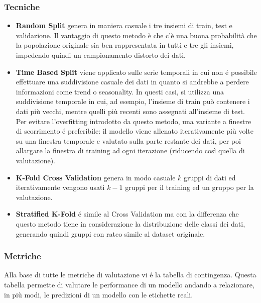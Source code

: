 \subsubsection{Tecniche}
\begin{itemize}
	\item \textbf{Random Split} genera in maniera casuale i tre insiemi di train, test e validazione. Il vantaggio di questo metodo è che c'è una buona probabilità che la popolazione originale sia ben rappresentata in tutti e tre gli insiemi, impedendo quindi un campionamento distorto dei dati.
	\item \textbf{Time Based Split} viene applicato sulle serie temporali in cui non é possibile effettuare una suddivisione casuale dei dati in quanto si andrebbe a perdere informazioni come trend o seasonality. 
	      In questi casi, si utilizza una suddivisione temporale in cui, ad esempio, l'insieme di train può contenere i dati più vecchi, mentre quelli più recenti sono assegnati all'insieme di test. Per evitare l'overfitting introdotto da questo metodo, una variante a finestre di scorrimento é preferibile: il modello viene allenato iterativamente più volte su una finestra temporale e valutato sulla parte restante dei dati, per poi allargare la finestra di training ad ogni iterazione (riducendo così quella di valutazione).
	\item \textbf{K-Fold Cross Validation} genera in modo casuale $k$ gruppi di dati ed iterativamente vengono usati $k-1$ gruppi per il training ed un gruppo per la valutazione.
	\item \textbf{Stratified K-Fold} é simile al Cross Validation ma con la differenza che questo metodo tiene in considerazione la distribuzione delle classi dei dati, generando quindi gruppi con rateo simile al dataset originale.
\end{itemize}


\subsubsection{Metriche}
Alla base di tutte le metriche di valutazione vi é la tabella di contingenza. Questa tabella permette di valutare le performance di un modello andando a relazionare, in più modi, le predizioni di un modello con le etichette reali.

